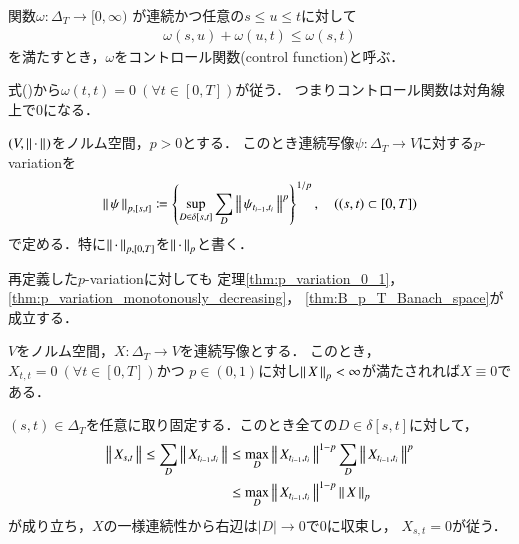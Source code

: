 	\begin{screen}
		\begin{dfn}[コントロール関数]
			関数$\omega:\Delta_T \longrightarrow [0,\infty)$
			が連続かつ任意の$s \leq u \leq t$に対して
			\begin{align}
				\omega(s,u) + \omega(u,t) \leq \omega(s,t)
				\label{eq:control_function_subadditivity}
			\end{align}
			を満たすとき，$\omega$をコントロール関数(control function)と呼ぶ．
		\end{dfn}
	\end{screen}
	
	式()から$\omega(t,t)=0\ (\forall t \in [0,T])$が従う．
	つまりコントロール関数は対角線上で0になる．
	
	\begin{screen}
		\begin{dfn}
			$(V,\left\|\, \cdot\, \right\|_{})$をノルム空間，$p > 0$とする．
			このとき連続写像$\psi:\Delta_T \longrightarrow V$に対する$p$-variationを
			\begin{align}
				\left\|\, \psi\, \right\|_{p,[s,t]}
				\coloneqq \left\{ \operatorname*{sup}_{D \in \delta[s,t]}  \sum_D \left\|\, \psi_{t_{i-1},t_i}\, \right\|_{}^p \right\}^{1/p},
				\quad ((s,t) \subset [0,T])
			\end{align}
			で定める．特に$\left\|\, \cdot\, \right\|_{p,[0,T]}$を$\left\|\, \cdot\, \right\|_{p}$と書く．
		\end{dfn}
	\end{screen}
	
	再定義した$p$-variationに対しても
	定理\ref{thm:p_variation_0_1}，\ref{thm:p_variation_monotonously_decreasing}，
	\ref{thm:B_p_T_Banach_space}が成立する．
	\begin{screen}
		\begin{thm}
			$V$をノルム空間，$X:\Delta_T \longrightarrow V$を連続写像とする．
			このとき，$X_{t,t} = 0\ (\forall t \in [0,T])$かつ
			$p \in (0, 1)$に対し$\left\|\, X\, \right\|_{p} < \infty$が満たされれば$X \equiv 0$である．
		\end{thm}
	\end{screen}

	\begin{prf}
		$(s,t) \in \Delta_T$を任意に取り固定する．このとき全ての$D \in \delta[s,t]$に対して，
		\begin{align}
			\left\|\, X_{s,t}\, \right\|_{} \leq \sum_D \left\|\, X_{t_{i-1},t_i}\, \right\|_{}
			&\leq \operatorname*{max}_{D} \left\|\, X_{t_{i-1},t_i}\, \right\|_{}^{1-p} 
				\sum_D \left\|\, X_{t_{i-1},t_i}\, \right\|_{}^p \\
			&\leq \operatorname*{max}_{D} \left\|\, X_{t_{i-1},t_i}\, \right\|_{}^{1-p} \left\|\, X\, \right\|_{p}
		\end{align}
		が成り立ち，$X$の一様連続性から右辺は$|D| \longrightarrow 0$で$0$に収束し，
		$X_{s,t} = 0$が従う．
		\QED
	\end{prf}
	
